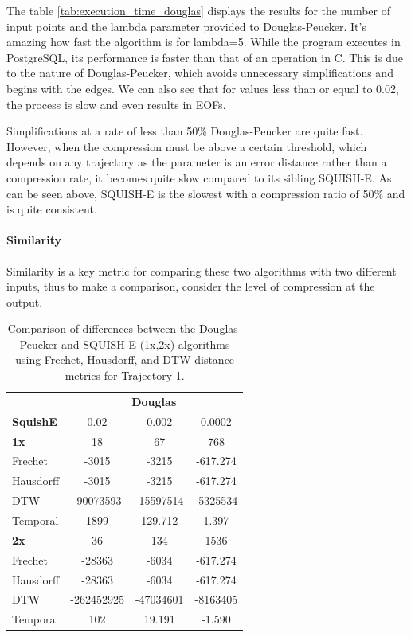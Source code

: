 The table \ref{tab:execution_time_douglas} displays the results for the number of input points and the lambda parameter provided to Douglas-Peucker.
It's amazing how fast the algorithm is for lambda=5. While the program executes in PostgreSQL, its performance is faster than that of an operation in C.  This is due to the nature of Douglas-Peucker, which avoids unnecessary simplifications and begins with the edges. We can also see that for values less than or equal to 0.02, the process is slow and even results in EOFs. 

Simplifications at a rate of less than 50\% Douglas-Peucker are quite fast. However, when the compression must be above a certain threshold, which depends on any trajectory as the parameter is an error distance rather than a compression rate, it becomes quite slow compared to its sibling SQUISH-E.  As can be seen above, SQUISH-E is the slowest with a compression ratio of 50\% and is quite consistent.


\paragraph{Similarity}
Similarity is a key metric for comparing these two algorithms with two different inputs, thus to make a comparison, consider the level of compression at the output. 


\begin{table}
	\centering
	\label{tab:douglas_vs_squish_comparison}
	\begin{tabular}{@{}lccc@{}}
		\toprule
		& \multicolumn{3}{c}{\textbf{Douglas}} \\
		\cmidrule(l){2-4}
		\textbf{SquishE} & 0.02 & 0.002 & 0.0002 \\
		\midrule
		\textbf{1x} 	& 18 	& 67 & 768 \\
		Frechet 		& -3015 & -3215 & -617.274 \\
		Hausdorff 		& -3015 	& -3215 & -617.274 \\
		DTW 			& -90073593 	& -15597514 & -5325534 \\
		Temporal 		& 1899 	& 129.712 & 1.397 \\ \midrule
		\textbf{2x} 	& 36 & 134 & 1536 \\
		Frechet 		& -28363 & -6034 & -617.274 \\
		Hausdorff 		& -28363 & -6034 & -617.274 \\
		DTW  		& -262452925 & -47034601 & -8163405 \\
		Temporal 	& 102 & 19.191 & -1.590 \\ 
		\bottomrule
	\end{tabular}
	\caption{Comparison of differences between the Douglas-Peucker and SQUISH-E (1x,2x) algorithms using Frechet, Hausdorff, and DTW distance metrics for Trajectory 1.}
\end{table}


